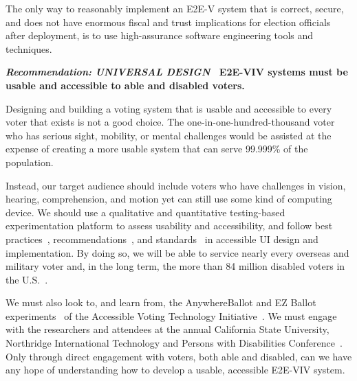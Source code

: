 The only way to reasonably implement an E2E-V system that is correct,
secure, and does not have enormous fiscal and trust implications for
election officials after deployment, is to use high-assurance software
engineering tools and techniques.

\vspace{12pt} \textbf{\emph{Recommendation: UNIVERSAL DESIGN} \
  E2E-VIV systems must be usable and accessible to able and disabled
  voters.}

Designing and building a voting system that is usable and accessible
to every voter that exists is not a good choice. The
one-in-one-hundred-thousand voter who has serious sight, mobility, or
mental challenges would be assisted at the expense of creating a more
usable system that can serve 99.999\% of the population.

Instead, our target audience should include voters who have challenges
in vision, hearing, comprehension, and motion yet can still use some
kind of computing device. We should use a qualitative and quantitative
testing-based experimentation platform to assess usability and
accessibility, and follow best
practices~\cite{materials-at-elections.itif.org},
recommendations~\cite{WAI,Section508,WAVE}, and
standards~\cite{standards} in accessible UI design and
implementation. By doing so, we will be able to service nearly every
overseas and military voter and, in the long term, the more than 84
million disabled voters in the U.S.~\cite{Brennen,CensusData}.

We must also look to, and learn from, the AnywhereBallot and EZ Ballot
experiments~\cite{AnywhereBallot,lee2012ez} of the Accessible Voting
Technology Initiative~\cite{AVTI}.  We must engage with the
researchers and attendees at the annual California State University,
Northridge International Technology and Persons with Disabilities
Conference~\cite{CSUN}. Only through direct engagement with voters,
both able and disabled, can we have any hope of understanding how to
develop a usable, accessible E2E-VIV system.

